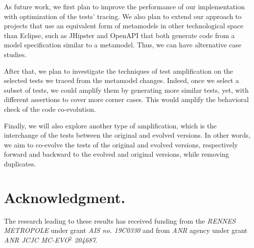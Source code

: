 As future work, we first plan to improve the performance of our implementation with optimization of the tests' tracing.  %
We also plan to extend our approach to projects that use an equivalent form of metamodels in other technological space than Eclipse, such as JHipster and OpenAPI that both generate code from a model specification similar to a metamodel. Thus, we can have alternative case studies. 

After that, we plan to investigate the techniques of test amplification on the selected tests we traced from the metamodel changes. Indeed, once we select a subset of tests, we could amplify them by generating more similar tests, yet, with different assertions to cover more corner cases. This would amplify the behavioral check of the code co-evolution. 

Finally, we will also explore another type of amplification, which is the interchange of the tests between the original and evolved versions. In other words, we aim to co-evolve the tests of the original and evolved versions, respectively forward and backward to the evolved and original versions, while removing duplicates. 




\section*{Acknowledgment.} 
The research leading to these results has received funding from the \emph{RENNES METROPOLE} under grant \emph{AIS no. 19C0330} and from \emph{ANR} agency under grant \emph{ANR JCJC MC-EVO$^{2}$ 204687}.